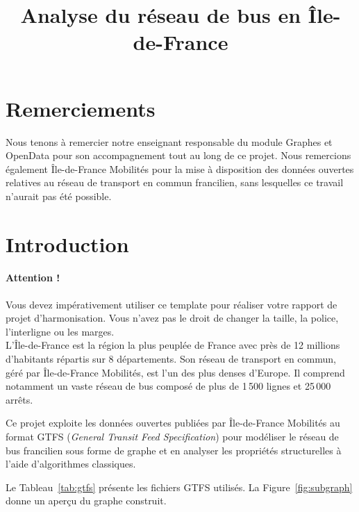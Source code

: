 \documentclass[a4paper, 12pt, twoside]{article}
\title{Analyse du réseau de bus en Île-de-France}
\begin{document}
\pagedegarde

\section*{Remerciements}
Nous tenons à remercier notre enseignant responsable du module Graphes et OpenData pour son accompagnement tout au long de ce projet. Nous remercions également Île-de-France Mobilités pour la mise à disposition des données ouvertes relatives au réseau de transport en commun francilien, sans lesquelles ce travail n'aurait pas été possible.

\newpage
\tableofcontents
\newpage

\section{Introduction}

\paragraph{Attention !} Vous devez impérativement utiliser ce template pour réaliser votre rapport de projet d'harmonisation. Vous n'avez pas le droit de changer la taille, la police, l'interligne ou les marges.\\

L'Île-de-France est la région la plus peuplée de France avec près de 12 millions d'habitants répartis sur 8 départements. Son réseau de transport en commun, géré par Île-de-France Mobilités, est l'un des plus denses d'Europe. Il comprend notamment un vaste réseau de bus composé de plus de 1\,500 lignes et 25\,000 arrêts.

Ce projet exploite les données ouvertes publiées par Île-de-France Mobilités \cite{IDFM} au format GTFS (\textit{General Transit Feed Specification}) \cite{GTFSDOC} pour modéliser le réseau de bus francilien sous forme de graphe et en analyser les propriétés structurelles à l'aide d'algorithmes classiques.

Le Tableau~\ref{tab:gtfs} présente les fichiers GTFS utilisés. La Figure~\ref{fig:subgraph} donne un aperçu du graphe construit.
\end{document}
